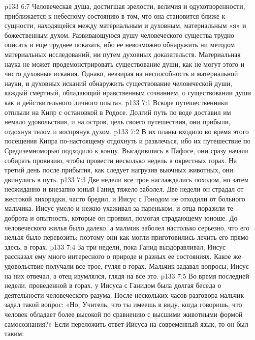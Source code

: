 \vs p133 6:7 Человеческая душа, достигшая зрелости, величия и одухотворенности, приближается к небесному состоянию в том, что она становится ближе к сущности, находящейся между материальным и духовным, материальным «я» и божественным духом. Развивающуюся душу человеческого существа трудно описать и еще труднее показать, ибо ее невозможно обнаружить ни методом материальных исследований, ни путем духовных доказательств. Материальная наука не может продемонстрировать существование души, как не могут этого и чисто духовные искания. Однако, невзирая на неспособность и материальной науки, и духовных исканий обнаружить существование человеческой души, каждый смертный, обладающий нравственным сознанием,  о существовании  души как  и действительного личного опыта».
\vs p133 7:1 Вскоре путешественники отплыли на Кипр с остановкой в Родосе. Долгий путь по воде доставил им немало удовольствия, и на остров, цель своего путешествия, они прибыли, отдохнув телом и воспрянув духом.
\vs p133 7:2 В их планы входило во время этого посещения Кипра по\hyp{}настоящему отдохнуть и развлечься, ибо их путешествие по Средиземноморью подходило к концу. Высадившись в Пафосе, они сразу начали собирать провизию, чтобы провести несколько недель в окрестных горах. На третий день после прибытия, как следует нагрузив вьючных животных, они двинулись в путь.
\vs p133 7:3 Две недели все трое наслаждались походом, но затем неожиданно и внезапно юный Ганид тяжело заболел. Две недели он страдал от жестокой лихорадки, часто бредил, и Иисус с Гонодом не отходили от больного мальчика. Иисус умело и нежно ухаживал за пареньком, и отца поразили те доброта и опытность, которые он проявил, помогая страдающему юноше. До человеческого жилья было далеко, а мальчик заболел настолько серьезно, что его нельзя было перевозить; поэтому они как могли приготовились лечить его прямо здесь, в горах.
\vs p133 7:4 За три недели, пока Ганид выздоравливал, Иисус рассказал ему много интересного о природе и разных ее состояниях. Какое же удовольствие получали все трое, гуляя в горах. Мальчик задавал вопросы, Иисус на них отвечал, а отец изумлялся, глядя на все это.
\vs p133 7:5 Во время последней недели, проведенной в горах, у Иисуса с Ганидом была долгая беседа о деятельности человеческого разума. После нескольких часов разговора мальчик задал такой вопрос: «Но, Учитель, что ты имеешь в виду, когда говоришь, что человек обладает более высокой по сравнению с высшими животными формой самосознания?» Если переложить ответ Иисуса на современный язык, то он был таким:
